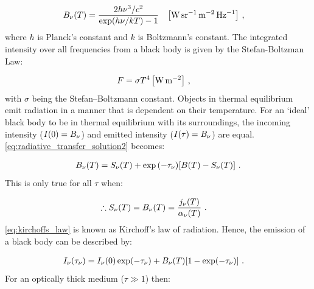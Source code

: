 \begin{equation}
	\begin{aligned}
		B_\nu\qty(T)&= \frac{2h\nu^3/c^2}{\exp(h\nu/kT)-1}\quad\qty[\si{\watt\per\steradian\per\meter\squared\per\hertz}] \text{ ,}
	\end{aligned}
\end{equation}
\noindent  where $h$ is Planck's constant and $k$ is Boltzmann's constant. The integrated intensity over all frequencies from a black body is given by the Stefan-Boltzman Law:

\begin{equation}
	\begin{aligned}
		F&=\sigma T^4\,\qty[\si{\watt\per\meter\squared}]\text{ ,}
	\end{aligned}
\end{equation}
\noindent with $\sigma$ being the Stefan–Boltzmann constant. Objects in thermal equilibrium emit radiation in a manner that is dependent on their temperature. For an `ideal' black body to be in thermal equilibrium with its surroundings, the incoming intensity ($I\qty(0)=B_\nu$) and emitted intensity ($I\qty(\tau)=B_\nu$) are equal. \autoref{eq:radiative_transfer_solution2} becomes:

\begin{equation}
    \begin{aligned}
        B_\nu\qty(T)&=S_\nu\qty(T) + \exp\qty(-\tau_\nu)\qty[B\qty(T)-S_\nu\qty(T)] \text{ .}\\
    \end{aligned}
\end{equation}
\noindent This is only true for all $\tau$ when:

\begin{equation}
    \begin{aligned}
    	\therefore S_\nu\qty(T) &= B_\nu\qty(T)=\frac{j_\nu\qty(T)}{\alpha_\nu\qty(T)}\text{ .}
    \end{aligned} \label{eq:kirchoffs_law}
    \end{equation}
\noindent \autoref{eq:kirchoffs_law} is known as Kirchoff's law of radiation. Hence, the emission of a black body can be described by:

\begin{equation}
    \begin{aligned}
        I_\nu\qty(\tau_\nu)&=I_\nu\qty(0)\exp(-\tau_\nu)+B_\nu\qty(T)\qty[1-\exp(-\tau_\nu)]\text{ .}
    \end{aligned} \label{eq:chapter_6_black_body_emission}
\end{equation}
\noindent For an optically thick medium ($\tau\gg 1$) then:

